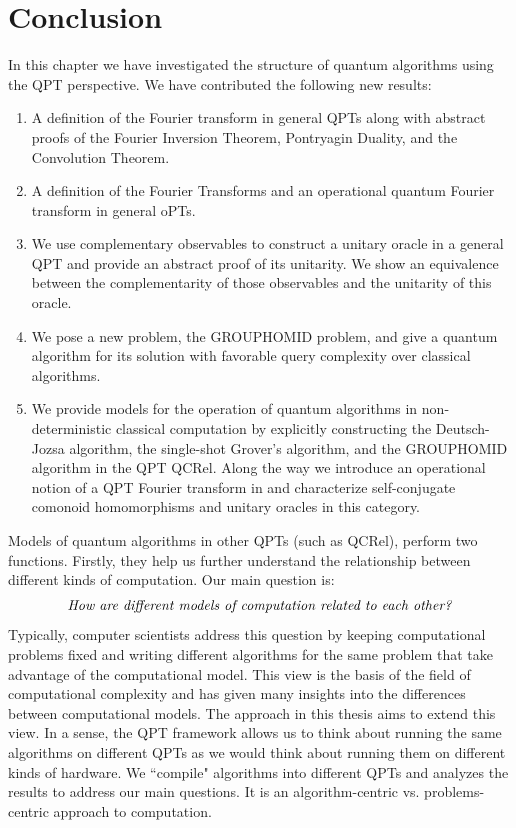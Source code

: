\section{Conclusion}
In this chapter we have investigated the structure of quantum algorithms using the QPT perspective. We have contributed the following new results:
\begin{enumerate}
\item A definition of the Fourier transform in general QPTs along with abstract proofs of the Fourier Inversion Theorem, Pontryagin Duality, and the Convolution Theorem.
\item A definition of the Fourier Transforms and an operational quantum Fourier transform in general oPTs.
\item We use complementary observables to construct a unitary oracle in a general QPT and provide an abstract proof of its unitarity.  We show an equivalence between the complementarity of those observables and the unitarity of this oracle.
\item We pose a new problem, the GROUPHOMID problem, and give a quantum algorithm for its solution with favorable query complexity over classical algorithms.
\item We provide models for the operation of quantum algorithms in non-deterministic classical computation by explicitly constructing the Deutsch-Jozsa algorithm, the single-shot Grover's algorithm, and the GROUPHOMID algorithm in the QPT QCRel. Along the way we introduce an operational notion of a QPT Fourier transform in  and characterize self-conjugate comonoid homomorphisms and unitary oracles in this category.
\end{enumerate}

Models of quantum algorithms in other QPTs (such as QCRel), perform two functions. Firstly, they help us further understand the relationship between different kinds of computation.  Our main question is: 
\begin{align*}
\mbox{\emph{How are different models of computation related to each other?}}
\end{align*}  Typically, computer scientists address this question by keeping computational problems fixed and writing different algorithms for the same problem that take advantage of the computational model. This view is the basis of the field of computational complexity and has given many insights into the differences between computational models. The approach in this thesis aims to extend this view. In a sense, the QPT framework allows us to think about running the same algorithms on different QPTs as we would think about running them on different kinds of hardware. We ``compile" algorithms into different QPTs and analyzes the results to address our main questions. It is an algorithm-centric vs. problems-centric approach to computation. 

